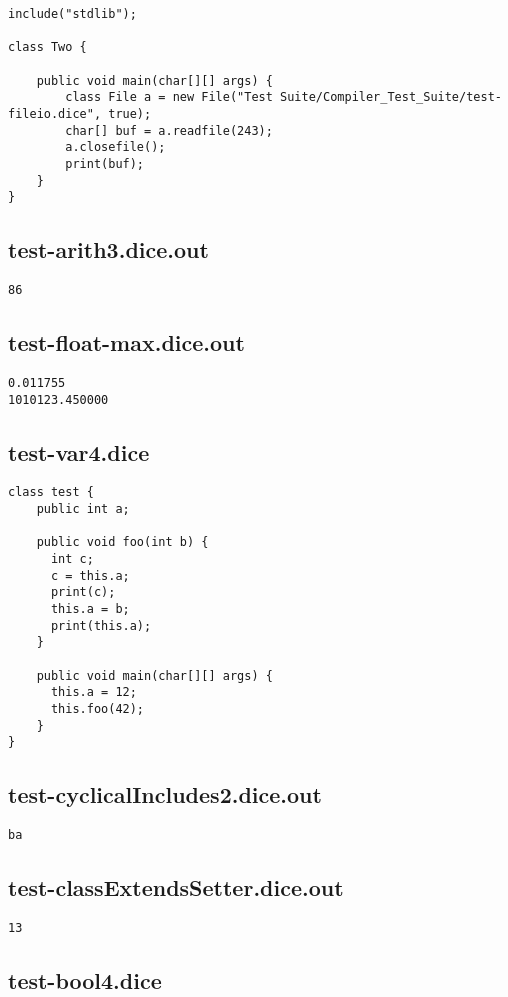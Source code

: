 \begin{verbatim}
include("stdlib");

class Two {

	public void main(char[][] args) {
        class File a = new File("Test Suite/Compiler_Test_Suite/test-fileio.dice", true);
        char[] buf = a.readfile(243);
        a.closefile();
        print(buf);
	}
}

\end{verbatim}\pagebreak\subsection{test-arith3.dice.out}
\begin{verbatim}
86
\end{verbatim}\pagebreak\subsection{test-float-max.dice.out}
\begin{verbatim}
0.011755
1010123.450000
\end{verbatim}\pagebreak\subsection{test-var4.dice}
\begin{verbatim}
class test {
	public int a;

	public void foo(int b) {
	  int c;
	  c = this.a;
	  print(c);
	  this.a = b;
	  print(this.a);
	}

	public void main(char[][] args) {
	  this.a = 12;
	  this.foo(42);
	}
}
\end{verbatim}\pagebreak\subsection{test-cyclicalIncludes2.dice.out}
\begin{verbatim}
ba
\end{verbatim}\pagebreak\subsection{test-classExtendsSetter.dice.out}
\begin{verbatim}
13
\end{verbatim}\pagebreak\subsection{test-bool4.dice}
